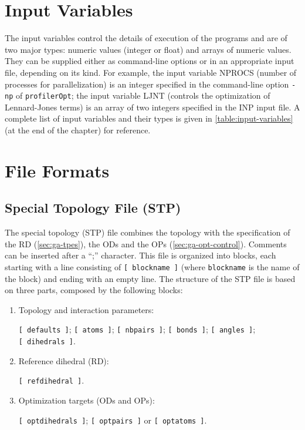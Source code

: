 \documentclass[10pt,a4paper,openany]{memoir}
\numberwithin{equation}{section}
\newcommand{\profileropt}[0]{\texttt{profilerOpt}}
\begin{document}
\section{Input Variables}
\label{sec:file-formats-input-variables}

The input variables control the details of execution of the programs
and are of two major types: numeric values (integer or float) and
arrays of numeric values. They can be supplied either as command-line
options or in an appropriate input file, depending on its kind.  For
example, the input variable NPROCS (number of processes for
parallelization) is an integer specified in the command-line option
\texttt{-np} of \profileropt{}; the input variable LJNT (controls the
optimization of Lennard-Jones terms) is an array of two integers
specified in the INP input file. A complete list of input variables
and their types is given in \autoref{table:input-variables} (at the
end of the chapter) for reference.

\section{File Formats}
\label{sec:file-formats-file-formats}

\subsection{Special Topology File (STP)}
\label{sec:file-formats-STP}

The special topology (STP) file combines the topology with the
specification of the RD (\autoref{sec:ga-tpes}), the ODs and the OPs
(\autoref{sec:ga-opt-control}). Comments can be inserted after a ``;''
character.  This file is organized into blocks, each starting with a
line consisting of \texttt{[~blockname~]} (where \texttt{blockname} is
the name of the block) and ending with an empty line.  The structure
of the STP file is based on three parts, composed by the following
blocks:
\begin{enumerate}
\item Topology and interaction parameters:\par \texttt{[~defaults~]}; \texttt{[~atoms~]}; \texttt{[~nbpairs~]}; \texttt{[~bonds~]}; \texttt{[~angles~]}; \texttt{[~dihedrals~]}.
\item Reference dihedral (RD):\par\texttt{[~refdihedral~]}.
\item Optimization targets (ODs and OPs):\par\texttt{[~optdihedrals~]}; \texttt{[~optpairs~]} or \texttt{[~optatoms~]}.
\end{enumerate}
\end{document}
